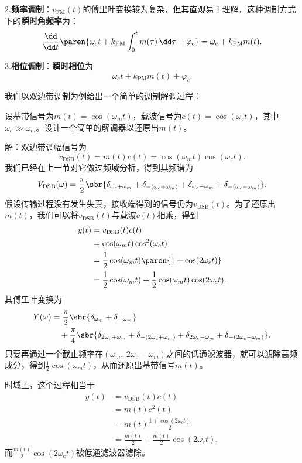 2.\textbf{频率调制}：$v_{\text{FM}}(t)$的傅里叶变换较为复杂，但其直观易于理解，这种调制方式下的\textbf{瞬时角频率}为：
\begin{equation}
    \frac{\dd}{\dd t}\paren{\omega_c t+k_{\text{FM}}\int_{0}^{t}m(\tau)\,\dd\tau+\varphi_c}=\omega_c+k_{\text{FM}}m(t).
\end{equation}

3.\textbf{相位调制}：\textbf{瞬时相位}为
\begin{equation}
    \omega_c t+k_{\text{PM}} m(t)+\varphi_c.
\end{equation}

我们以双边带调制为例给出一个简单的调制解调过程：
\begin{example}
    设基带信号为$m(t)=\cos(\omega_m t)$，载波信号为$c(t)=\cos(\omega_c t)$，其中$\omega_c\gg \omega_m$。设计一个简单的解调器以还原出$m(t)$。

    解：双边带调幅信号为
    \begin{equation}
        v_{\text{DSB}}(t)=m(t)c(t)=\cos(\omega_m t)\cos(\omega_c t).
    \end{equation}
    我们已经在上一节对它做过频域分析，得到其频谱为
    \begin{equation}
        V_{\text{DSB}}(\omega)=\frac{\pi}{2}\sbr{\delta_{\omega_c+\omega_m}+\delta_{-(\omega_c+\omega_m)}+\delta_{\omega_c-\omega_m}+\delta_{-(\omega_c-\omega_m)}}.
    \end{equation}
    假设传输过程没有发生失真，接收端得到的信号仍为$v_{\text{DSB}}(t)$。为了还原出$m(t)$，我们可以将$v_{\text{DSB}}(t)$与载波$c(t)$相乘，得到
    \begin{align}
        y(t)&=v_{\text{DSB}}(t)c(t)\nonumber\\
        &=\cos(\omega_m t)\cos^2(\omega_c t)\nonumber\\
        &=\frac{1}{2}\cos(\omega_m t)\paren{1+\cos(2\omega_c t)}\nonumber\\
        &=\frac{1}{2}\cos(\omega_m t)+\frac{1}{2}\cos(\omega_m t)\cos(2\omega_c t).
    \end{align}
    其傅里叶变换为
    \begin{align}
        Y(\omega)&=\frac{\pi}{2}\sbr{\delta_{\omega_m}+\delta_{-\omega_m}}\nonumber\\
        &\quad+\frac{\pi}{4}\sbr{\delta_{2\omega_c+\omega_m}+\delta_{-(2\omega_c+\omega_m)}+\delta_{2\omega_c-\omega_m}+\delta_{-(2\omega_c-\omega_m)}}.
    \end{align}
    只要再通过一个截止频率在$(\omega_m,\ 2\omega_c-\omega_m)$之间的低通滤波器，就可以滤除高频成分，得到$\displaystyle \frac{1}{2}\cos(\omega_m t)$，从而还原出基带信号$m(t)$。
\end{example}
时域上，这个过程相当于
\begin{align}
    y(t)&=v_{\text{DSB}}(t)c(t)\nonumber\\
    &=m(t)c^2(t)\nonumber\\
    &=m(t)\frac{1+\cos(2\omega_c t)}{2}\nonumber\\
    &=\frac{m(t)}{2}+\frac{m(t)}{2}\cos(2\omega_c t),
\end{align}
而$\displaystyle \frac{m(t)}{2}\cos(2\omega_c t)$被低通滤波器滤除。

